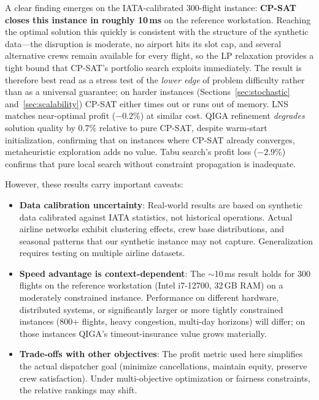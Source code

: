 \documentclass[12pt,number]{elsarticle}
\begin{document}
A clear finding emerges on the IATA-calibrated 300-flight instance: \textbf{CP-SAT closes this instance in roughly 10\,ms} on the reference workstation. Reaching the optimal solution this quickly is consistent with the structure of the synthetic data---the disruption is moderate, no airport hits its slot cap, and several alternative crews remain available for every flight, so the LP relaxation provides a tight bound that CP-SAT's portfolio search exploits immediately. The result is therefore best read as a stress test of the \emph{lower edge} of problem difficulty rather than as a universal guarantee; on harder instances (Sections~\ref{sec:stochastic} and~\ref{sec:scalability}) CP-SAT either times out or runs out of memory. LNS matches near-optimal profit ($-0.2\%$) at similar cost. QIGA refinement \emph{degrades} solution quality by 0.7\% relative to pure CP-SAT, despite warm-start initialization, confirming that on instances where CP-SAT already converges, metaheuristic exploration adds no value. Tabu search's profit loss ($-2.9\%$) confirms that pure local search without constraint propagation is inadequate.

However, these results carry important caveats:

\begin{itemize}
\item \textbf{Data calibration uncertainty}: Real-world results are based on synthetic data calibrated against IATA statistics, not historical operations. Actual airline networks exhibit clustering effects, crew base distributions, and seasonal patterns that our synthetic instance may not capture. Generalization requires testing on multiple airline datasets.

\item \textbf{Speed advantage is context-dependent}: The $\sim$10\,ms result holds for 300 flights on the reference workstation (Intel i7-12700, 32\,GB RAM) on a moderately constrained instance. Performance on different hardware, distributed systems, or significantly larger or more tightly constrained instances (800+ flights, heavy congestion, multi-day horizons) will differ; on those instances QIGA's timeout-insurance value grows materially.

\item \textbf{Trade-offs with other objectives}: The profit metric used here simplifies the actual dispatcher goal (minimize cancellations, maintain equity, preserve crew satisfaction). Under multi-objective optimization or fairness constraints, the relative rankings may shift.
\end{itemize}
\end{document}
